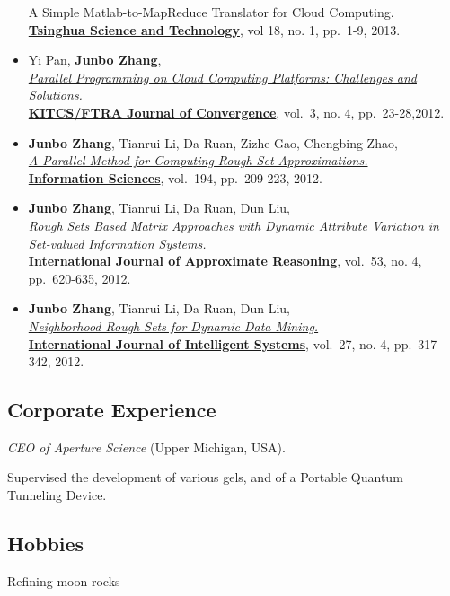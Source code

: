 \documentclass[]{article}
\renewenvironment{description}{
  \begin{basedescript}{\desclabelstyle{\pushlabel}\desclabelwidth{10em}}
}{
  \end{basedescript}
}
\begin{document}
\begin{itemize}
{{  A Simple Matlab-to-MapReduce Translator for Cloud Computing.}}\\
  \href{http://qhxb.lib.tsinghua.edu.cn/english/}{\textbf{Tsinghua
  Science and Technology}}, vol 18, no. 1, pp.~1-9, 2013.
\item
  Yi Pan, \textbf{Junbo Zhang},\\
  \href{http://www.ftrai.org/xe/index.php?mid=joc_published\&category=37964\&search_keyword=section\&search_target=title\&document_srl=38459}{\emph{Parallel
  Programming on Cloud Computing Platforms: Challenges and
  Solutions.}}\\ \href{http://www.ftrai.org/joc/}{\textbf{KITCS/FTRA
  Journal of Convergence}}, vol.~3, no. 4, pp.~23-28,2012.
\item
  \textbf{Junbo Zhang}, Tianrui Li, Da Ruan, Zizhe Gao, Chengbing
  Zhao,\\ \href{http://dx.doi.org/10.1016/j.ins.2011.12.036}{\emph{A
  Parallel Method for Computing Rough Set Approximations.}}\\
  \href{http://www.journals.elsevier.com/information-sciences}{\textbf{Information
  Sciences}}, vol.~194, pp.~209-223, 2012.
\item
  \textbf{Junbo Zhang}, Tianrui Li, Da Ruan, Dun Liu,\\
  \href{http://dx.doi.org/10.1016/j.ijar.2012.01.001}{\emph{Rough Sets
  Based Matrix Approaches with Dynamic Attribute Variation in Set-valued
  Information Systems.}}\\
  \href{http://www.journals.elsevier.com/international-journal-of-approximate-reasoning}{\textbf{International
  Journal of Approximate Reasoning}}, vol.~53, no. 4, pp.~620-635, 2012.
\item
  \textbf{Junbo Zhang}, Tianrui Li, Da Ruan, Dun Liu,\\
  \href{http://dx.doi.org/10.1002/int.21523}{\emph{Neighborhood Rough
  Sets for Dynamic Data Mining.}}\\
  \href{http://onlinelibrary.wiley.com/journal/10.1002/{[}ISSN{]}1098-111X}{\textbf{International
  Journal of Intelligent Systems}}, vol.~27, no. 4, pp.~317-342, 2012.
\end{itemize}

\subsection{Corporate Experience}\label{corporate-experience}

\begin{description}
\item[1940-1980]
\emph{CEO of Aperture Science} (Upper Michigan, USA).

Supervised the development of various gels, and of a Portable Quantum
Tunneling Device.
\end{description}

\subsection{Hobbies}\label{hobbies}

\begin{description}
\itemsep1pt\parskip0pt
\item[Interests]
Refining moon rocks
\end{description}
\end{document}
